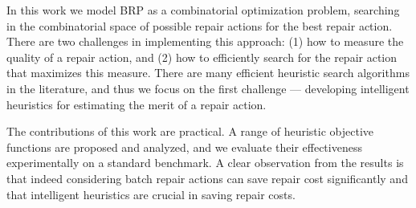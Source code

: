 \documentclass[review]{elsarticle}
\begin{document}
In this work we model BRP as a combinatorial optimization problem, searching in the combinatorial space of possible repair actions for the best repair action. There are two challenges in implementing this approach: (1) how to measure the quality of a repair action, and (2) how to efficiently search for the repair action that maximizes this measure. There are many efficient heuristic search algorithms in the literature, and thus we focus on the first challenge --- developing intelligent heuristics for estimating the merit of a repair action.






The contributions of this work are practical. A range of heuristic objective functions are proposed and analyzed, and we evaluate their effectiveness experimentally on a standard benchmark. A clear observation from the results is that indeed considering batch repair actions can save repair cost significantly and that intelligent heuristics are crucial in saving repair costs.%

\end{document}
